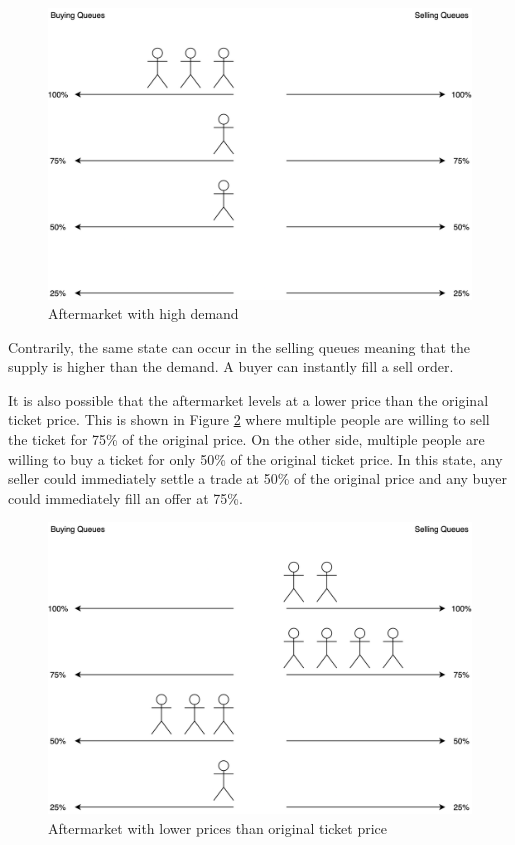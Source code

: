 \begin{figure}[H]
    \centering
    \includegraphics[width=16cm]{figures/aftermarket-high-demand.png}
    \caption{Aftermarket with high demand}
    \label{fig:aftermarket-high-demand}
\end{figure}

Contrarily, the same state can occur in the selling queues meaning that the supply is higher than the demand. A buyer can instantly fill a sell order.

It is also possible that the aftermarket levels at a lower price than the original ticket price. This is shown in Figure \ref{fig:aftermarket-mixed} where multiple people are willing to sell the ticket for 75\% of the original price. On the other side, multiple people are willing to buy a ticket for only 50\% of the original ticket price. In this state, any seller could immediately settle a trade at 50\% of the original price and any buyer could immediately fill an offer at 75\%. 

\begin{figure}[H]
    \centering
    \includegraphics[width=16cm]{figures/aftermarket-mixed.png}
    \caption{Aftermarket with lower prices than original ticket price}
    \label{fig:aftermarket-mixed}
\end{figure}

